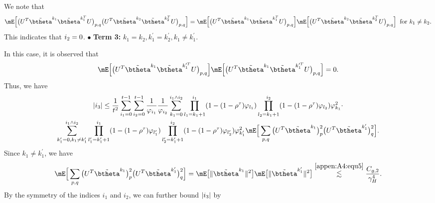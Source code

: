 \noindent We note that
\begin{equation*}
\mE\Big[\big(U^T \tilde{\btheta}^{k_1}\tilde{\btheta}^{k_1^{T}}U\big)_{p,q}\big(U^T \tilde{\btheta}^{k_2}\tilde{\btheta}^{k_2^{T}}U\big)_{p,q}\Big]=\mE\Big[\big(U^T \tilde{\btheta}^{k_1}\tilde{\btheta}^{k_1^{T}}U\big)_{p,q}\Big]\mE\Big[\big(U^T \tilde{\btheta}^{k_2}\tilde{\btheta}^{k_2^{T}}U\big)_{p,q}\Big]\;\;\text{for }k_1\neq k_2.
\end{equation*}
This indicates that $\uppercase\expandafter{\romannumeral1}_2 = 0$.
\vskip0.3cm
\noindent$\bullet$ \textbf{Term 3:} $k_1=k_2,  k_1^{\prime}=k_2^{\prime},  k_1 \neq k_1^{\prime}$.

\noindent In this case, it is observed that
\begin{equation*}
\mE\Big[\big(U^T \tilde{\btheta}^{k_1}\tilde{\btheta}^{k_1^{\prime T}}U\big)_{p,q}\Big]\mE\Big[\big(U^T \tilde{\btheta}^{k_1}\tilde{\btheta}^{k_1^{\prime T}}U\big)_{p,q}\Big] = 0.
\end{equation*}
Thus, we have
\begin{multline*}
|\uppercase\expandafter{\romannumeral1}_3|\leq \frac{1}{t^2} \sum_{i_1=0}^{t-1} \sum_{i_2=0}^{t-1} \frac{1}{\varphi_{i_1}}\frac{1}{\varphi_{i_2}} \sum_{k_1=0}^{i_1 \wedge i_2} \prod_{l_1=k_1+1}^{i_1}(1- (1-\rho^\tau)\varphi_{l_1}) \prod_{l_2=k_1+1}^{i_2}(1- (1-\rho^\tau)\varphi_{l_2}) \varphi_{k_1}^2\cdot\\
\sum_{k_1^{\prime}=0, k_1\neq k_1^{\prime}}^{i_1 \wedge i_2} \prod_{l_1^{\prime}=k_1^{\prime}+1}^{i_1}(1- (1-\rho^\tau)\varphi_{l_1^{\prime}}) \prod_{l_2^{\prime}=k_1^{\prime}+1}^{i_2}(1- (1-\rho^\tau)\varphi_{l_2^{\prime}}) \varphi_{k_1^{\prime}}^2\mE\Big[\sum_{p, q}\big(U^T \tilde{\btheta}^{k_1}\big)_p^2\big(U^T \tilde{\btheta}^{k_1^{\prime}}\big)_q^2\Big].
\end{multline*}
Since $k_1\neq k_1^{\prime}$, we have
\begin{equation*}
\mE\Big[\sum_{p, q}\big(U^T \tilde{\btheta}^{k_1}\big)_p^2\big(U^T \tilde{\btheta}^{k_1^{\prime}}\big)_q^2\Big]= \mE\big[\|\tilde{\btheta}^{k_1}\|^2\big] \mE\big[\|\tilde{\btheta}^{k_1^\prime}\|^2\big] \stackrel{\eqref{appen:A4:equ5}}{\lesssim}\frac{C_{g,2}}{\gamma_H^4}.
\end{equation*}
By the symmetry of the indices $i_1$ and $i_2$, we can further bound $|\uppercase\expandafter{\romannumeral1}_3|$ by
